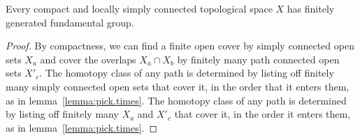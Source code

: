 \begin{corollary}
Every compact and locally simply connected topological space \(X\) has finitely generated fundamental group.
\end{corollary}
\begin{proof}
By compactness, we can find a finite open cover by simply connected open sets \(X_a\) and cover the overlaps \(X_a \cap X_b\) by finitely many path connected open sets \(X'_c\).
The homotopy class of any path is determined by listing off finitely many simply connected open sets that cover it, in the order that it enters them, as in lemma~\vref{lemma:pick.times}.
The homotopy class of any path is determined by listing off finitely many \(X_a\) and \(X'_c\) that cover it, in the order it enters them, as in lemma~\vref{lemma:pick.times}.
\end{proof}
